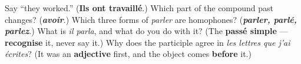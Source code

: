 \begin{tcolorbox}[breakable,colback=teal!4,colframe=teal!35!black,title={Before you move on}]
Say \textquotedblleft{}they worked.\textquotedblright{} (\textbf{Ils ont travaillé}.) Which part of the compound past changes? (\emph{\textbf{avoir}}.) Which three forms of \emph{parler} are homophones? (\emph{\textbf{parler, parlé, parlez}}.) What is \emph{il parla}, and what do you do with it? (The \textbf{passé simple} — \textbf{recognise} it, never say it.) Why does the participle agree in \emph{les lettres que j'ai écrites}? (It was an \textbf{adjective} first, and the object comes \textbf{before} it.)
\end{tcolorbox}
